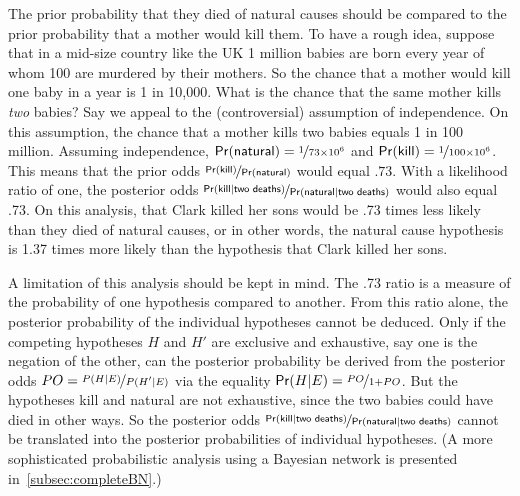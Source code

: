 \documentclass{article}
\newcommand{\pr}{\mathsf{Pr}}
\begin{document}
The prior probability that they died of natural causes 
should be compared to the prior probability that a mother would kill them. %
To have a rough idea, suppose that in a mid-size country like the UK 1 million babies are born every year of whom 100 are murdered by their mothers. So the chance that a mother would kill one baby in a year is 1 in 10,000. What is the chance that the same mother kills \textit{two} babies? Say we appeal to the (controversial) assumption of independence. On this assumption, the chance that a mother kills two babies equals %
1 in 100 million. %
Assuming independence, 
$\pr(\textsf{natural})=\nicefrac{1}{73\times10^6}$ and $\pr(\textsf{kill})=\nicefrac{1}{100\times 10^6}$.
This means that the prior odds $\nicefrac{\pr(\textsf{kill})}{\pr(\textsf{natural})}$ would equal $.73$. 
With a likelihood ratio of one, the posterior 
odds $ \nicefrac{\pr(\textsf{kill} \vert \textsf{two deaths})}{\pr(\textsf{natural} \vert \textsf{two deaths})}$ would also equal .73. On this analysis, that Clark killed her sons would be .73 times less likely than they died of natural causes, or in other words, the natural cause hypothesis is 1.37 times more likely than the hypothesis that Clark killed her sons. 






A limitation of this analysis should be kept in mind. The .73 ratio is a measure of the probability of one hypothesis compared to another.
From this ratio alone, the posterior probability of the individual hypotheses %
cannot be deduced.  %
Only if the competing hypotheses $H$ and $H'$ are exclusive and exhaustive, say one is the negation of the other, can the posterior probability be derived from the posterior odds $PO=\nicefrac{P(H \vert E)}{ P(H' \vert E)}$ via the equality $\pr(H\vert E)= \nicefrac{PO}{1+PO}$. 
But the hypotheses \textsf{kill} and \textsf{natural} are not exhaustive, since the two babies could have died in other ways. So the posterior odds
$ \nicefrac{\pr(\textsf{kill} \vert \textsf{two deaths})}{\pr(\textsf{natural} \vert \textsf{two deaths})}$ cannot be translated into the posterior probabilities of individual hypotheses. 
(A more sophisticated probabilistic analysis using a Bayesian network is presented in~\ref{subsec:completeBN}.)







 
  


   
   
\end{document}
